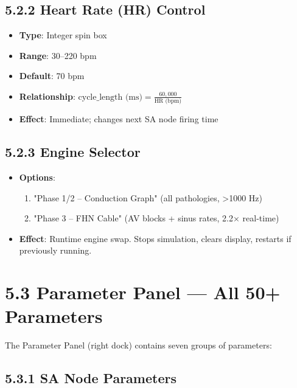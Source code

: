 \documentclass[12pt,oneside,a4paper]{book}
\begin{document}
\subsection{5.2.2 Heart Rate (HR) Control}

\begin{itemize}
  \item \textbf{Type}: Integer spin box
  \item \textbf{Range}: 30--220 bpm
  \item \textbf{Default}: 70 bpm
  \item \textbf{Relationship}: $\text{cycle\_length (ms)} = \frac{60,000}{\text{HR (bpm)}}$
  \item \textbf{Effect}: Immediate; changes next SA node firing time
\end{itemize}

\subsection{5.2.3 Engine Selector}

\begin{itemize}
  \item \textbf{Options}:
    \begin{enumerate}
      \item "Phase 1/2 – Conduction Graph" (all pathologies, \textgreater 1000 Hz)
      \item "Phase 3 – FHN Cable" (AV blocks + sinus rates, 2.2× real-time)
    \end{enumerate}
  \item \textbf{Effect}: Runtime engine swap. Stops simulation, clears display, restarts if previously running.
\end{itemize}

\section{5.3 Parameter Panel — All 50+ Parameters}

The Parameter Panel (right dock) contains seven groups of parameters:

\subsection{5.3.1 SA Node Parameters}
\end{document}
